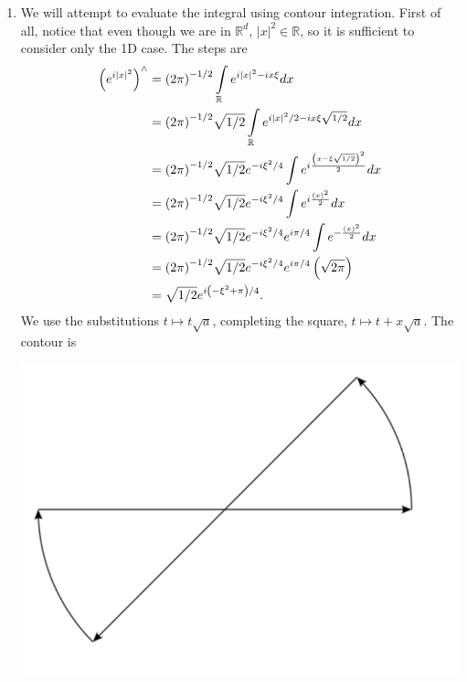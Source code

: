 \documentclass[letterpaper,twoside,11pt]{article}
\theoremstyle{mystyle}
\newcommand{\R}{{\mathbb R}}
\begin{document}
\begin{enumerate}
  \item We will attempt to evaluate the integral using contour integration. First of all, notice that even though we are in $\R^d$, ${\left| x \right|^2} \in \mathbb{R}$, so it is sufficient to consider only the 1D case. The steps are 
  \begin{align*}
    {\left( {{e^{i{{\left| x \right|}^2}}}} \right)^ \wedge } &= {\left( {2\pi } \right)^{ - 1/2}}\int\limits_\mathbb{R} {{e^{i{{\left| x \right|}^2} - ix\xi }}dx}  \hfill \\
     &= {\left( {2\pi } \right)^{ - 1/2}}\sqrt {1/2} \int\limits_\mathbb{R} {{e^{i{{\left| x \right|}^2}/2 - ix\xi \sqrt {1/2} }}dx}  \hfill \\
     &= {\left( {2\pi } \right)^{ - 1/2}}\sqrt {1/2} {e^{ - i{\xi ^2}/4}}\int {{e^{i\frac{{{{\left( {x - \xi \sqrt {1/2} } \right)}^2}}}{2}}}dx}  \hfill \\
     &= {\left( {2\pi } \right)^{ - 1/2}}\sqrt {1/2} {e^{ - i{\xi ^2}/4}}\int {{e^{i\frac{{{{\left( x \right)}^2}}}{2}}}dx}  \hfill \\
     &= {\left( {2\pi } \right)^{ - 1/2}}\sqrt {1/2} {e^{ - i{\xi ^2}/4}}{e^{i\pi /4}}\int {{e^{ - \frac{{{{\left( x \right)}^2}}}{2}}}dx}  \hfill \\
     &= {\left( {2\pi } \right)^{ - 1/2}}\sqrt {1/2} {e^{ - i{\xi ^2}/4}}{e^{i\pi /4}}\left( {\sqrt {2\pi } } \right) \hfill \\
     &= \sqrt {1/2} {e^{i\left( { - {\xi ^2} + \pi } \right)/4}}.
    \end{align*}
    We use the substitutions $t \mapsto t \sqrt{a}$, completing the square, $t \mapsto t + x\sqrt{a}$. The contour is 
    \begin{center}
      \includegraphics*[scale=0.3]{Untitled.png}

\end{center}
\end{enumerate}
\end{document}
